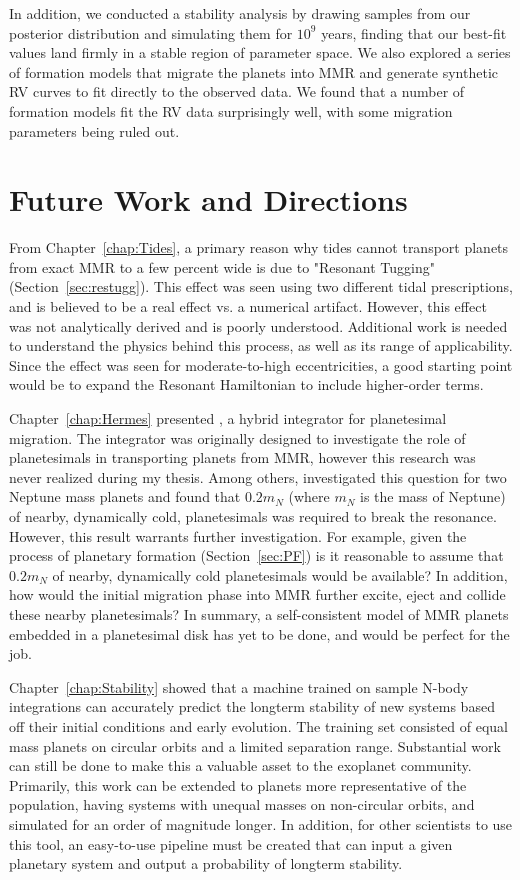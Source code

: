 In addition, we conducted a stability analysis by drawing samples from our posterior distribution and simulating them for $10^9$ years, finding that our best-fit values land firmly in a stable region of parameter space.
We also explored a series of formation models that migrate the planets into MMR and generate synthetic RV curves to fit directly to the observed data. 
We found that a number of formation models fit the RV data surprisingly well, with some migration parameters being ruled out.

\section{Future Work and Directions}
From Chapter~\ref{chap:Tides}, a primary reason why tides cannot transport planets from exact MMR to a few percent wide is due to "Resonant Tugging" (Section~\ref{sec:restugg}).
This effect was seen using two different tidal prescriptions, and is believed to be a real effect vs. a numerical artifact. 
However, this effect was not analytically derived and is poorly understood. 
Additional work is needed to understand the physics behind this process, as well as its range of applicability.
Since the effect was seen for moderate-to-high eccentricities, a good starting point would be to expand the Resonant Hamiltonian to include higher-order terms. 

Chapter~\ref{chap:Hermes} presented \hermes, a hybrid integrator for planetesimal migration. 
The integrator was originally designed to investigate the role of planetesimals in transporting planets from MMR, however this research was never realized during my thesis. 
Among others, \citet{Chatterjee2015} investigated this question for two Neptune mass planets and found that $0.2m_N$ (where $m_N$ is the mass of Neptune) of nearby, dynamically cold, planetesimals was required to break the resonance. 
However, this result warrants further investigation. 
For example, given the process of planetary formation (Section~\ref{sec:PF}) is it reasonable to assume that $0.2m_N$ of nearby, dynamically cold planetesimals would be available?
In addition, how would the initial migration phase into MMR further excite, eject and collide these nearby planetesimals?
In summary, a self-consistent model of MMR planets embedded in a planetesimal disk has yet to be done, and \hermes would be perfect for the job.

Chapter~\ref{chap:Stability} showed that a machine trained on sample N-body integrations can accurately predict the longterm stability of new systems based off their initial conditions and early evolution. 
The training set consisted of equal mass planets on circular orbits and a limited separation range. 
Substantial work can still be done to make this a valuable asset to the exoplanet community.
Primarily, this work can be extended to planets more representative of the \kep population, having systems with unequal masses on non-circular orbits, and simulated for an order of magnitude longer. 
In addition, for other scientists to use this tool, an easy-to-use pipeline must be created that can input a given planetary system and output a probability of longterm stability. 

